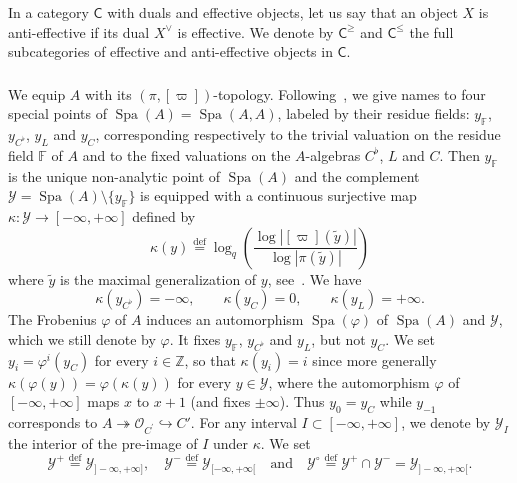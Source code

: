 \documentclass[11pt]{article}
\theoremstyle{definition}
\numberwithin{equation}{section}
\numberwithin{figure}{section}
\numberwithin{table}{section}
\DeclareMathOperator{\Spa}{Spa}
\newcommand{\eqd}{\stackrel{\mathrm{def}}{=}}
\newcommand{\sfC}{\mathsf{C}}
\let\tilde\widetilde
\begin{document}
\subsubsection{}

In a category $\sfC$ with duals and effective objects, let us say that an object $X$ is anti-effective if its dual $X^{\vee}$ is effective. We denote by $\sfC^{\geq}$ and $\sfC^{\leq}$ the full subcategories of effective and anti-effective objects in $\sfC$.

\subsubsection{}

We equip $A$ with its $(\pi,[\varpi])$-topology. Following~\cite[12.2]{ScWe15}, we give names to four special points of $\Spa(A)=\Spa(A,A)$, labeled by their residue fields: $y_{\mathbb{F}}$, $y_{C^{\flat}}$, $y_{L}$ and $y_{C}$, corresponding respectively to the trivial valuation on the residue field $\mathbb{F}$ of $A$ and to the fixed valuations on the $A$-algebras $C^{\flat}$, $L$ and $C$. Then $y_{\mathbb{F}}$ is the unique non-analytic point of $\Spa(A)$ and the complement $\mathscr{Y}=\Spa(A)\setminus\{y_{\mathbb{F}}\}$ is equipped with a continuous surjective map $\kappa:\mathscr{Y}\rightarrow[-\infty,+\infty]$ defined by
\[
\kappa(y)\eqd\log_{q}\left(\frac{\log\left|[\varpi](\tilde{y})\right|}{\log\left|\pi(\tilde{y})\right|}\right)
\]
where $\tilde{y}$ is the maximal generalization of $y$, see~\cite[12.2]{ScWe15}. We have
\[
\kappa(y_{C^{\flat}})=-\infty,\qquad\kappa(y_{C})=0,\qquad\kappa(y_{L})=+\infty.
\]
The Frobenius $\varphi$ of $A$ induces an automorphism $\Spa(\varphi)$ of $\Spa(A)$ and $\mathscr{Y}$, which we still denote by $\varphi$. It fixes $y_{\mathbb{F}}$, $y_{C^{\flat}}$ and $y_{L}$, but not $y_{C}$. We set $y_{i}=\varphi^{i}(y_{C})$ for every $i\in\mathbb{Z}$, so that $\kappa(y_{i})=i$ since more generally $\kappa(\varphi(y))=\varphi(\kappa(y))$ for every $y\in\mathscr{Y}$, where the automorphism $\varphi$ of $[-\infty,+\infty]$ maps $x$ to $x+1$ (and fixes $\pm\infty$). Thus $y_{0}=y_{C}$ while $y_{-1}$ corresponds to $A\twoheadrightarrow\mathcal{O}_{C^{\prime}}\hookrightarrow C'$. For any interval $I\subset[-\infty,+\infty]$, we denote by $\mathscr{Y}_{I}$ the interior of the pre-image of $I$ under $\kappa$. We set
\[
\mathscr{Y}^{+}\eqd\mathscr{Y}_{]-\infty,+\infty]},\quad\mathscr{Y}^{-}\eqd\mathscr{Y}_{[-\infty,+\infty[}\quad\text{and}\quad\mathscr{Y}^{\circ}\eqd\mathscr{Y}^{+}\cap\mathscr{Y}^{-}=\mathscr{Y}_{]-\infty,+\infty[}.
\]
\end{document}
